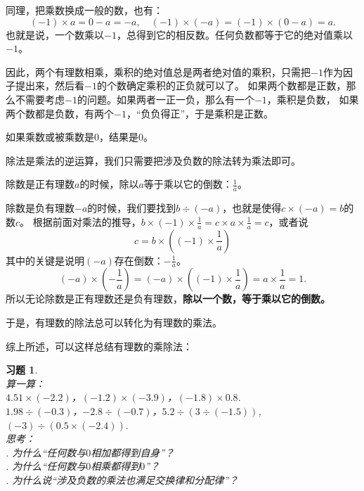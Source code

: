\documentclass[12pt,UTF8]{ctexbook}
\newtheorem{xt}{习题}[section]
\begin{document}
同理，把乘数换成一般的数，也有：
$$(-1) \times a =  0 - a = -a, \quad (-1) \times (-a) = (-1) \times (0 - a) = a.$$
也就是说，一个数乘以$-1$，总得到它的相反数。任何负数都等于它的绝对值乘以$-1$。

因此，两个有理数相乘，乘积的绝对值总是两者绝对值的乘积，只需把$-1$作为因子提出来，然后看$-1$的个数确定乘积的正负就可以了。
如果两个数都是正数，那么不需要考虑$-1$的问题。如果两者一正一负，那么有一个$-1$，乘积是负数，
如果两个数都是负数，有两个$-1$，“负负得正”，于是乘积是正数。

如果乘数或被乘数是$0$，结果是$0$。

除法是乘法的逆运算，我们只需要把涉及负数的除法转为乘法即可。

除数是正有理数$a$的时候，除以$a$等于乘以它的倒数：$\frac{1}{a}$。

除数是负有理数$-a$的时候，我们要找到$b \div (-a)$，也就是使得$c \times (-a) = b$的数$c$。
根据前面对乘法的推导，$ b \times (-1) \times \frac{1}{a} = c \times a \times \frac{1}{a} = c$，或者说
$$c = b\times \left((-1) \times \frac{1}{a}\right)$$
其中的关键是说明$(-a)$存在倒数：$-\frac{1}{a}$。
$$ (-a)\times \left(-\frac{1}{a}\right) = (-a)\times \left((-1) \times \frac{1}{a}\right) = a \times \frac{1}{a} = 1. $$
所以无论除数是正有理数还是负有理数，\textbf{除以一个数，等于乘以它的倒数。}

于是，有理数的除法总可以转化为有理数的乘法。

综上所述，可以这样总结有理数的乘除法：
\begin{center}
\end{center}

\begin{xt}\label{xt:3-0-1}
    \mbox{}\\
    \indent 算一算：\\
    \indent $4.51 \times (-2.2)$，$(-1.2) \times (-3.9)$，$(-1.8)\times 0.8.$ \\
    \indent $1.98 \div (-0.3)$，$-2.8 \div (-0.7)$，$5.2 \div (3 \div (-1.5))$, $(-3) \div (0.5 \times (-2.4)).$ \\
    \indent 思考：\\
    . 为什么“任何数与$0$相加都得到自身”？\\
    . 为什么“任何数与$0$相乘都得到$0$”？\\
    . 为什么说“涉及负数的乘法也满足交换律和分配律”？
\end{xt}
\end{document}
